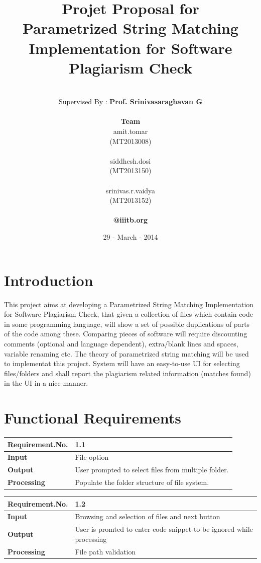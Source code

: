\documentclass[11pt]{article}
\title{\textbf{Projet Proposal for 	 \\ Parametrized String Matching Implementation for Software Plagiarism Check}}
\author{
		\vspace{ 2 mm}\\
		Supervised By : \textbf{Prof. Srinivasaraghavan G}\\
		\vspace {2mm}\\
		\textbf{Team} \\	
		amit.tomar \\
		(MT2013008) \\
		\vspace{ -1 mm}\\		
		siddhesh.dosi\\								     
		(MT2013150) \\		
		\vspace{ -1 mm}\\					
		srinivas.r.vaidya\\
		(MT2013152) \\
		\vspace{ -2 mm}\\		
		\textbf{@iiitb.org}}
\date{29 - March - 2014}
\begin{document}
\lstset{language=C} 
\maketitle

\vspace{ 100 mm}

\section{Introduction}

This project aims at developing a Parametrized String Matching Implementation for Software Plagiarism Check, that given a collection of files which contain code in some programming language, will show a set of possible duplications of parts of the code among these. Comparing pieces of software will require discounting comments (optional and language dependent), extra/blank lines and spaces, variable renaming etc. The theory of parametrized string matching will be used to implementat this project. System will have an easy-to-use UI for selecting files/folders and shall report the plagiarism related information (matches found) in the UI in a nice manner.

\section{ Functional Requirements}

  \begin{center}
    \begin{tabular}{ | l | p{10cm} |}
    \hline
    {\textbf{Requirement.No.}} & {1.1} \\ \hline
    \textbf{Input}      & File option \\ \hline
    \textbf{Output}     & User prompted to select files from multiple folder. \\ \hline
    \textbf{Processing} & Populate the folder structure of file system. \\ \hline
    \end{tabular}
\end{center}

  \begin{center}
    \begin{tabular}{ | l | p{10cm} |}
    \hline
    {\textbf{Requirement.No.}} & {1.2} \\ \hline
    \textbf{Input}      & Browsing and selection of files and next button \\ \hline
    \textbf{Output}     & User is promted to enter code snippet to be ignored while processing \\ \hline
    \textbf{Processing} & File path validation \\ \hline
    \end{tabular}
\end{center}
\end{document}

